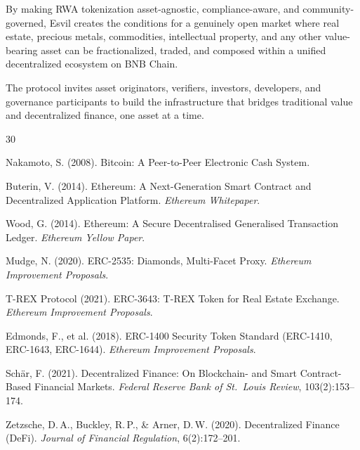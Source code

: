 \documentclass[11pt,a4paper]{article}
\begin{document}
By making RWA tokenization asset-agnostic, compliance-aware, and community-governed, Esvil creates the conditions for a genuinely open market where real estate, precious metals, commodities, intellectual property, and any other value-bearing asset can be fractionalized, traded, and composed within a unified decentralized ecosystem on BNB Chain.

The protocol invites asset originators, verifiers, investors, developers, and governance participants to build the infrastructure that bridges traditional value and decentralized finance, one asset at a time.



\begin{thebibliography}{30}

Nakamoto, S. (2008).
\newblock Bitcoin: A Peer-to-Peer Electronic Cash System.

Buterin, V. (2014).
\newblock Ethereum: A Next-Generation Smart Contract and Decentralized Application Platform.
\newblock \textit{Ethereum Whitepaper}.

Wood, G. (2014).
\newblock Ethereum: A Secure Decentralised Generalised Transaction Ledger.
\newblock \textit{Ethereum Yellow Paper}.

Mudge, N. (2020).
\newblock ERC-2535: Diamonds, Multi-Facet Proxy.
\newblock \textit{Ethereum Improvement Proposals}.

T-REX Protocol (2021).
\newblock ERC-3643: T-REX Token for Real Estate Exchange.
\newblock \textit{Ethereum Improvement Proposals}.

Edmonds, F., et al. (2018).
\newblock ERC-1400 Security Token Standard (ERC-1410, ERC-1643, ERC-1644).
\newblock \textit{Ethereum Improvement Proposals}.

Sch\"ar, F. (2021).
\newblock Decentralized Finance: On Blockchain- and Smart Contract-Based Financial Markets.
\newblock \textit{Federal Reserve Bank of St.\ Louis Review}, 103(2):153--174.

Zetzsche, D.\,A., Buckley, R.\,P., \& Arner, D.\,W. (2020).
\newblock Decentralized Finance (DeFi).
\newblock \textit{Journal of Financial Regulation}, 6(2):172--201.


\end{thebibliography}
\end{document}
